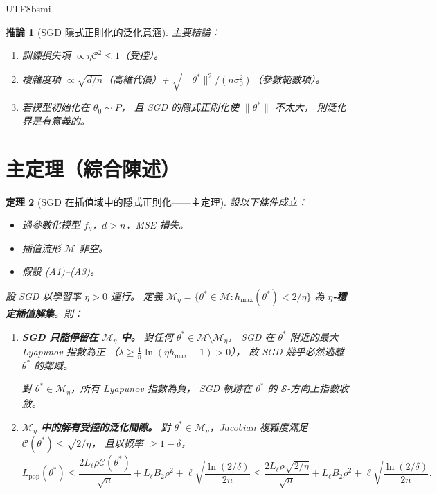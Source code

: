 \documentclass[11pt,a4paper]{article}
\newtheorem{theorem}{定理}
\newtheorem{corollary}[theorem]{推論}
\theoremstyle{definition}
\newcommand{\cM}{\mathcal{M}}
\newcommand{\cS}{\mathcal{S}}
\newcommand{\cC}{\mathcal{C}}
\begin{document}
\begin{CJK}{UTF8}{bsmi}
\begin{corollary}[SGD 隱式正則化的泛化意涵]
  主要結論：
  \begin{enumerate}
    \item 訓練損失項 $\propto \eta\cC^2 \leq 1$（受控）。
    \item 複雜度項 $\propto \sqrt{d/n}$（高維代價）+
      $\sqrt{\|\theta^*\|^2/(n\sigma_0^2)}$（參數範數項）。
    \item 若模型初始化在 $\theta_0\sim P$，
      且 SGD 的隱式正則化使 $\|\theta^*\|$ 不太大，
      則泛化界是有意義的。
  \end{enumerate}
\end{corollary}

\section{主定理（綜合陳述）}

\begin{theorem}[SGD 在插值域中的隱式正則化——主定理]\label{thm:main}
  設以下條件成立：
  \begin{itemize}
    \item 過參數化模型 $f_\theta$，$d > n$，MSE 損失。
    \item 插值流形 $\cM$ 非空。
    \item 假設 (A1)--(A3)。
  \end{itemize}

  設 SGD 以學習率 $\eta > 0$ 運行。
  定義 $\cM_\eta = \{\theta^*\in\cM : h_{\max}(\theta^*) < 2/\eta\}$
  為 \textbf{$\eta$-穩定插值解集}。則：

  \begin{enumerate}
    \item[\textbf{(選擇)}]
    \textbf{SGD 只能停留在 $\cM_\eta$ 中。}
    對任何 $\theta^*\in\cM\setminus\cM_\eta$，
    SGD 在 $\theta^*$ 附近的最大 Lyapunov 指數為正
    （$\lambda\geq\frac{1}{n}\ln(\eta h_{\max}-1)>0$），
    故 SGD 幾乎必然逃離 $\theta^*$ 的鄰域。

    對 $\theta^*\in\cM_\eta$，所有 Lyapunov 指數為負，
    SGD 軌跡在 $\theta^*$ 的 $\cS$-方向上指數收斂。

    \item[\textbf{(泛化)}]
    \textbf{$\cM_\eta$ 中的解有受控的泛化間隙。}
    對 $\theta^*\in\cM_\eta$，Jacobian 複雜度滿足
    $\cC(\theta^*) \leq \sqrt{2/\eta}$，
    且以概率 $\geq 1-\delta$，
    \[
      L_{\mathrm{pop}}(\theta^*) \leq \frac{2L_\ell\rho\cC(\theta^*)}{\sqrt{n}} + L_\ell B_2\rho^2
      + \overline{\ell}\sqrt{\frac{\ln(2/\delta)}{2n}}
      \leq \frac{2L_\ell\rho\sqrt{2/\eta}}{\sqrt{n}} + L_\ell B_2\rho^2
      + \overline{\ell}\sqrt{\frac{\ln(2/\delta)}{2n}}.
    \]


\end{enumerate}
\end{theorem}
\end{CJK}
\end{document}
